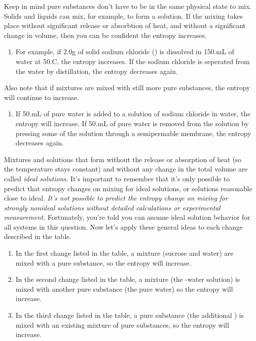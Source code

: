 \documentclass{article}  %
\begin{document}
Keep in mind pure substances don't have to be in the same physical state to mix. Solids and liquids can mix, for example, to form a solution. If the mixing takes place without significant release or absorbtion of heat, and without a significant change in volume, then you can be confident the entropy increases. 
\begin{enumerate}
    \item For example, if 2.0g of solid sodium chloride () is dissolved in 150.mL of water at 50.C, the entropy increases. If the sodium chloride is seperated from the water by distillation, the entropy decreases again.
\end{enumerate}
Also note that if mixtures are mixed with still more pure substances, the entropy will continue to increase.
\begin{enumerate}
    \item If 50.mL of pure water is added to a solution of sodium chloride in water, the entropy will increase. If 50.mL of pure water is removed from the solution by pressing some of the solution through a semipermable membrane, the entropy decreases again.
\end{enumerate}
Mixtures and solutions that form without the release or absorption of heat (so the temperature stays constant) and without any change in the total volume are called \emph{ideal solutions}. It's important to remember that it's only possible to predict that entropy changes on mixing for ideal solutions, or solutions reasonable close to ideal. \emph{It's not possible to predict the entropy change on mixing for strongly nonideal solutions without detailed calculations or experimental measurement.}
\newline
Fortunately, you're told you can assume ideal solution behavior for all systems in this question. 
\newline
Now let's apply these general ideas to each change described in the table.
\begin{enumerate}
    \item In the first change listed in the table, a mixture (sucrose and water) are mixed with a pure substance, so the entropy will increase.
    \item In the second change listed in the table, a mixture (the -water solution) is mixed with another pure substance (the pure water) so the entropy will increase.
    \item In the third change listed in the table, a pure substance (the additional ) is mixed with an existing mixture of pure substances, so the entropy will increase.
\end{enumerate}
\end{document}
